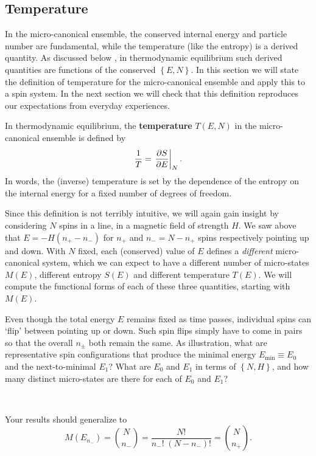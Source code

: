 \subsection{\label{sec:temp}Temperature}
In the micro-canonical ensemble, the conserved internal energy and particle number are fundamental, while the temperature (like the entropy) is a derived quantity.
As discussed below , in thermodynamic equilibrium such derived quantities are functions of the conserved $\left\{E, N\right\}$.
In this section we will state the definition of temperature for the micro-canonical ensemble and apply this to a spin system.
In the next section we will check that this definition reproduces our expectations from everyday experiences.

\begin{shaded}
  In thermodynamic equilibrium, the \textbf{temperature} $T(E, N)$ in the micro-canonical ensemble is defined by
  \begin{equation}
    \label{eq:temperature}
    \frac{1}{T} = \left. \frac{\partial S}{\partial E}\right|_N.
  \end{equation}
  In words, the (inverse) temperature is set by the dependence of the entropy on the internal energy for a fixed number of degrees of freedom.
\end{shaded}

Since this definition is not terribly intuitive, we will again gain insight by considering $N$ spins in a line, in a magnetic field of strength $H$.
We saw above that $E = -H(n_+ - n_-)$ for $n_+$ and $n_- = N - n_+$ spins respectively pointing up and down.
With $N$ fixed, each (conserved) value of $E$ defines a \textit{different} micro-canonical system, which we can expect to have a different number of micro-states $M(E)$, different entropy $S(E)$ and different temperature $T(E)$.
We will compute the functional forms of each of these three quantities, starting with $M(E)$.

Even though the total energy $E$ remains fixed as time passes, individual spins can `flip' between pointing up or down.
Such spin flips simply have to come in pairs so that the overall $n_{\pm}$ both remain the same.
As illustration, what are representative spin configurations that produce the minimal energy $E_{\text{min}} \equiv E_0$ and the next-to-minimal $E_1$?
What are $E_0$ and $E_1$ in terms of $\left\{N, H\right\}$, and how many distinct micro-states are there for each of $E_0$ and $E_1$?
\begin{mdframed}
  \ \\[100 pt]
\end{mdframed}
Your results should generalize to
\begin{equation}
  \label{eq:spin_states}
  M(E_{n_-}) = \binom{N}{n_-} = \frac{N!}{n_-! \; (N - n_-)!} = \binom{N}{n_+}.
\end{equation}

